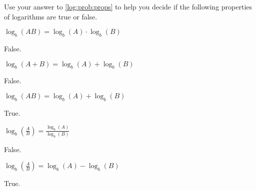 \begin{problem}
Use your answer to \cref{log:prob:props} to help you decide if the following 
properties of logarithms are true or false.
\begin{subproblem}
	$\log_b(AB)=\log_b(A)\cdot\log_b(B)$    
	\begin{shortsolution}
		False.
	\end{shortsolution}
\end{subproblem}
\begin{subproblem}
	$\log_b(A+B)=\log_b(A)+\log_b(B)$ 
	\begin{shortsolution}
		False.
	\end{shortsolution}
\end{subproblem}
\begin{subproblem}
	$\log_b(AB)=\log_b(A)+\log_b(B)$ 
	\begin{shortsolution}
		True.
	\end{shortsolution}
\end{subproblem}
\begin{subproblem}
	$\log_b\left( \frac{A}{B} \right)=\frac{\log_b(A)}{\log_b(B)}$ 
	\begin{shortsolution}
		False.
	\end{shortsolution}
\end{subproblem}
\begin{subproblem}
	$\log_b\left( \frac{A}{B} \right)=\log_b(A)-\log_b(B)$
	\begin{shortsolution}
		True.
	\end{shortsolution}
\end{subproblem}
\end{problem}
